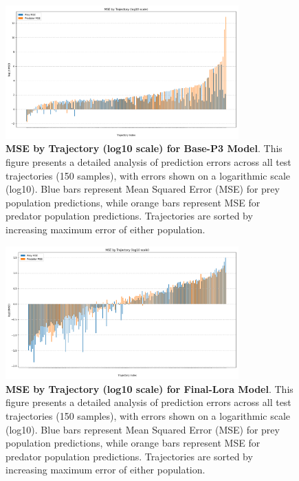 \documentclass{article}
\begin{document}
\begin{figure} [H]
    \centering
    \includegraphics[width=0.8\textwidth]{trajectory_errors_p3}
    \caption{\textbf{MSE by Trajectory (log10 scale) for Base-P3 Model}. This figure presents a detailed analysis of prediction errors across all test trajectories (150 samples), with errors shown on a logarithmic scale (log10). Blue bars represent Mean Squared Error (MSE) for prey population predictions, while orange bars represent MSE for predator population predictions. Trajectories are sorted by increasing maximum error of either population.}
    \label{fig:error_lora_p3_trajectory}
\end{figure}

\begin{figure}[H]
    \centering
    \includegraphics[width=0.8\textwidth]{trajectory_errors}
    \caption{\textbf{MSE by Trajectory (log10 scale) for Final-Lora Model}. This figure presents a detailed analysis of prediction errors across all test trajectories (150 samples), with errors shown on a logarithmic scale (log10). Blue bars represent Mean Squared Error (MSE) for prey population predictions, while orange bars represent MSE for predator population predictions. Trajectories are sorted by increasing maximum error of either population.}
    \label{fig:error_final_p2_trajectory}
\end{figure}
\end{document}

